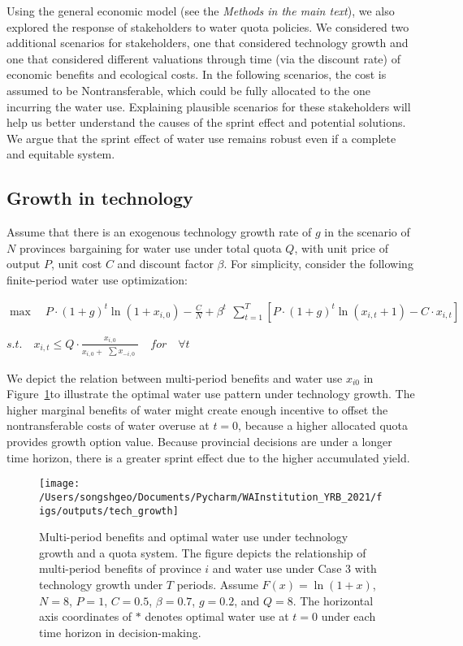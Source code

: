 

Using the general economic model (see the \textit{Methods in the main text}), we also explored the response of stakeholders to water quota policies.
We considered two additional scenarios for stakeholders, one that considered technology growth and one that considered different valuations through time (via the discount rate) of economic benefits and ecological costs.
In the following scenarios, the cost is assumed to be Nontransferable, which could be fully allocated to the one incurring the water use.
Explaining plausible scenarios for these stakeholders will help us better understand the causes of the sprint effect and potential solutions.
We argue that the sprint effect of water use remains robust even if a complete and equitable system.

\subsection*{Growth in technology}

Assume that there is an exogenous technology growth rate of $g$ in the scenario of $N$ provinces bargaining for water use under total quota $Q$, with unit price of output $P$, unit cost $C$ and discount factor $\beta$.
For simplicity, consider the following finite-period water use optimization:

$ \max \quad P \cdot (1+g)^t \ln(1+x_{i,0})-\frac{C}{N}+\beta^t \begin{matrix} \sum_{t=1}^T [P \cdot (1+g)^t \ln(x_{i,t}+1)-C \cdot x_{i,t}] \end{matrix}$

$s.t. \quad x_{i,t} \leq Q \cdot \frac{x_{i,0}}{x_{i,0} + \begin{matrix} \sum x_{-i,0} \end{matrix}} \quad for \quad \forall t$

We depict the relation between multi-period benefits and water use $x_{i0}$ in Figure~\ref{fig:tech_growth}to illustrate the optimal water use pattern under technology growth.
The higher marginal benefits of water might create enough incentive to offset the nontransferable costs of water overuse at $t=0$, because a higher allocated quota provides growth option value.
Because provincial decisions are under a longer time horizon, there is a greater sprint effect due to the higher accumulated yield.

\begin{figure}[!h]
	\centering
	\texttt{[image: /Users/songshgeo/Documents/Pycharm/WAInstitution\_YRB\_2021/figs/outputs/tech\_growth]}
	\caption{Multi-period benefits and optimal water use under technology growth and a quota system. The figure depicts the relationship of multi-period benefits of province $i$ and water use under Case 3 with technology growth under $T$ periods. Assume $F(x)=\ln(1+x)$, $N=8$, $P=1$, $C=0.5$, $\beta=0.7$, $g=0.2$, and $Q=8$. The horizontal axis coordinates of $*$ denotes optimal water use at $t=0$ under each time horizon in decision-making.}
	\label{fig:tech_growth}
\end{figure}

